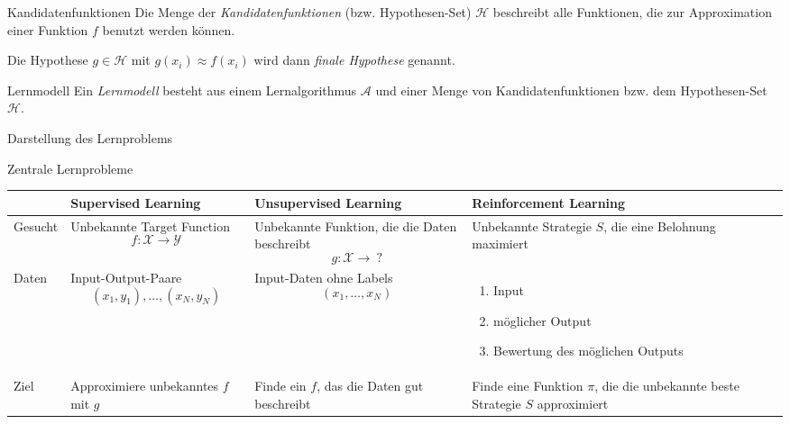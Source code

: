 \begin{defi}{Kandidatenfunktionen}
    Die Menge der \emph{Kandidatenfunktionen} (bzw. Hypothesen-Set) $\mathcal{H}$ beschreibt alle Funktionen, die zur Approximation einer Funktion $f$ benutzt werden können.

    Die Hypothese $g \in \mathcal{H}$ mit $g(x_i) \approx f(x_i)$ wird dann \emph{finale Hypothese} genannt.
\end{defi}

\begin{defi}{Lernmodell}
    Ein \emph{Lernmodell} besteht aus einem Lernalgorithmus $\mathcal{A}$ und einer Menge von Kandidatenfunktionen bzw. dem Hypothesen-Set $\mathcal{H}$.
\end{defi}

\begin{bonus}{Darstellung des Lernproblems}

\end{bonus}

\begin{defi}{Zentrale Lernprobleme}
    \begin{tabularx}{\textwidth}{l|X|X|X}
                & \bfseries Supervised Learning                                   & \bfseries Unsupervised Learning                                            & \bfseries Reinforcement Learning                                               \\
        \hline
        Gesucht & Unbekannte Target Function \[ f: \mathcal{X} \to \mathcal{Y} \] & Unbekannte Funktion, die die Daten beschreibt \[ g: \mathcal{X} \to \ ? \] & Unbekannte Strategie $S$, die eine Belohnung maximiert                         \\
        \hline
        Daten   & Input-Output-Paare \[ (x_1, y_1), \ldots, (x_N, y_N) \]         & Input-Daten ohne Labels \[ (x_1, \ldots, x_N) \]                           &
        \begin{enumerate}
            \item Input
            \item möglicher Output
            \item Bewertung des möglichen Outputs
        \end{enumerate}                                                                                                                                                                                                               \\
        \hline
        Ziel    & Approximiere unbekanntes $f$ mit $g$                            & Finde ein $f$, das die Daten gut beschreibt                                & Finde eine Funktion $\pi$, die die unbekannte beste Strategie $S$ approximiert \\
    \end{tabularx}
\end{defi}

